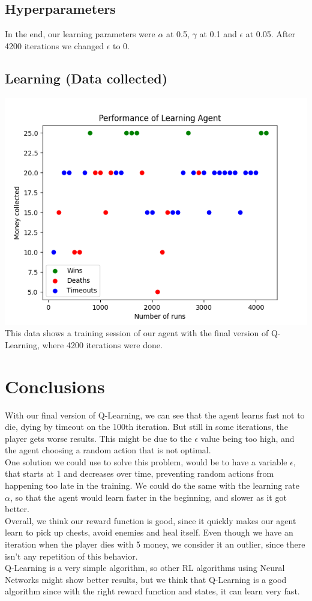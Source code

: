 \documentclass{article}
\begin{document}
  \subsection{Hyperparameters}
  In the end, our learning parameters were $\alpha$ at 0.5, $\gamma$ at 0.1 and $\epsilon$ at 0.05.
  After 4200 iterations we changed $\epsilon$ to 0.

  \subsection{Learning (Data collected)}
  
  \includegraphics{graph.png}
  \newline
  This data shows a training session of our agent with the final version of Q-Learning, where 4200 iterations were done.\\

  \section{Conclusions}
  With our final version of Q-Learning, we can see that the agent learns fast not to die, dying by timeout on the 100th iteration.
  But still in some iterations, the player gets worse results. This might be due to the $\epsilon$ value being too high, and the agent 
  choosing a random action that is not optimal.\\
  One solution we could use to solve this problem, would be to have a variable $\epsilon$, that starts at 1 and decreases over time, preventing random actions 
  from happening too late in the training. We could do the same with the learning rate $\alpha$, so that the agent would learn faster in the beginning, and slower
  as it got better.\\
  Overall, we think our reward function is good, since it quickly makes our agent learn to pick up chests, avoid enemies and heal itself.
  Even though we have an iteration when the player dies with 5 money, we consider it an outlier, since there isn't any repetition of this behavior.\\
  Q-Learning is a very simple algorithm, so other RL algorithms using Neural Networks might show better results, but we think that Q-Learning is a good algorithm 
  since with the right reward function and states, it can learn very fast.\\
\end{document}
